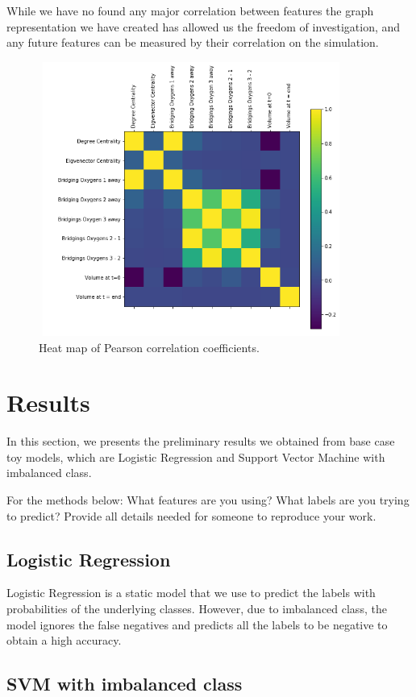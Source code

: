 While we have no found any major correlation between features the graph representation we have created has allowed us the freedom of investigation, and any future features can be measured by their correlation on the simulation. 


\begin{figure}[H]
    \centering
    \noindent
\includegraphics[width=10cm , height = 9cm]{images/Heatmap.PNG}
    \caption{Heat map of Pearson correlation coefficients.}
    \label{fig:heatmap}
\end{figure}

\section{Results}
In this section, we presents the preliminary results we obtained from base case toy models, which are Logistic Regression and Support Vector Machine with imbalanced class.

{\color{red} For the methods below: What features are you using?  What labels are you trying to predict?  Provide all details needed for someone to reproduce your work.}

\subsection{Logistic Regression}
Logistic Regression is a static model that we use to predict the labels with probabilities of the underlying classes. However, due to imbalanced class, the model ignores the false negatives and predicts all the labels to be negative to obtain a high accuracy. 

\subsection{SVM with imbalanced class}

